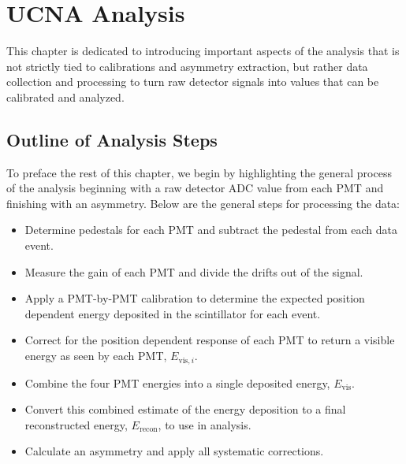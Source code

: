 \chapter{UCNA Analysis}
\label{ch:UCNA_Analysis}

This chapter is dedicated to introducing important aspects of the analysis that
is not strictly tied to calibrations and asymmetry extraction, but rather
data collection and processing to turn raw detector signals into values that
can be calibrated and analyzed. 






\section{Outline of Analysis Steps} \label{sec:outline}

To preface the rest of this chapter, we begin by highlighting
the general process of the analysis beginning with a raw detector
ADC value from each PMT and finishing with an asymmetry.
Below are the general steps for processing the data:

\begin{itemize}
\item Determine pedestals for each PMT and subtract the pedestal from each data event.
\item Measure the gain of each PMT and divide the drifts out of the signal.
\item Apply a PMT-by-PMT calibration to determine the expected position dependent
  energy deposited in the scintillator
  for each event.
\item Correct for the position dependent response of each PMT
  to return a visible energy as seen by each PMT, $E_{\mathrm{vis},i}$.
\item Combine the four PMT energies into a single deposited energy, $E_{\mathrm{vis}}$.
\item Convert this combined estimate of the energy deposition to a final
  reconstructed energy, $E_{\mathrm{recon}}$, to use in analysis.
\item Calculate an asymmetry and apply all systematic corrections.
\end{itemize}

